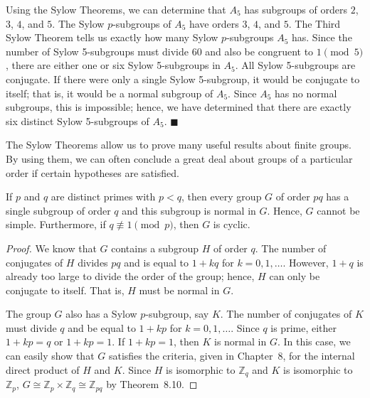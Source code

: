  
Using the Sylow Theorems, we can determine that $A_5$ has subgroups of
orders $2$, $3$, $4$, and $5$. The Sylow $p$-subgroups of $A_5$ have
orders $3$, $4$, and $5$. The Third Sylow Theorem tells us exactly how
many Sylow $p$-subgroups $A_5$ has. Since the number of Sylow 
5-subgroups must divide 60 and also be congruent to $1 \pmod{5}$,
there are either one or six Sylow 5-subgroups in $A_5$. All Sylow
5-subgroups are conjugate.  If there were only a single Sylow 
5-subgroup, it would be conjugate to itself; that is, it would be a
normal subgroup of $A_5$. Since $A_5$ has no normal subgroups, this is 
impossible; hence, we have determined that there are exactly six
distinct Sylow 5-subgroups of $A_5$. 
\hspace{\fill} $\blacksquare$
 
 
\medskip
 
 
The Sylow Theorems allow us to prove many useful results about finite
groups. By using them, we can often conclude a great deal about groups 
of a particular order if certain hypotheses are satisfied.
 
 
\begin{theorem}
If $p$ and $q$ are distinct primes with $p<q$, then every group $G$ of
order $pq$ has a single subgroup of order $q$ and this subgroup is
normal in $G$.  Hence, $G$ cannot be simple.  Furthermore, if $q
\not\equiv 1 \pmod{p}$, then $G$ is cyclic.
\end{theorem}
 
 
\begin{proof}
We know that $G$ contains a subgroup $H$ of order $q$. The number of
conjugates of $H$  divides $pq$ and is equal to $1 +kq$ for $k = 0, 1,
\ldots$. However, $1+q$ is already too large to divide the order of
the group; hence, $H$ can only be conjugate to itself.  That is, $H$
must be normal in $G$. 
 
 
The group $G$ also has a Sylow $p$-subgroup, say $K$. The number of
conjugates of $K$ must divide $q$ and be equal to $1 + kp$ for $k = 0,
1, \ldots$. Since $q$ is prime, either $1 +kp=q$ or $1+kp =1$. If $1
+kp=1$, then $K$ is normal in $G$. In this case, we can easily show
that $G$ satisfies the criteria, given in Chapter~8, for the
internal direct product of $H$ and $K$.  Since $H$ is isomorphic to
${\mathbb Z}_q$ and $K$ is isomorphic to ${\mathbb Z}_p$, $G \cong {\mathbb
Z}_p \times {\mathbb Z}_q  \cong {\mathbb Z}_{pq}$ by Theorem~8.10. 
\end{proof}
 
 
\medskip
 
